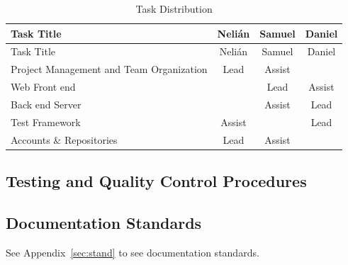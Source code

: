 \begin{center}
\setlength{\extrarowheight}{1.5pt}
  \begin{longtable}{|m{3.25in}|c|c|c|}
 \caption{Task Distribution \label{tasks}} \\
   \hline
  
  \centering Task Title & Nelián & Samuel & Daniel \\
  \hline \hline \endfirsthead
  
     \hline

	\centering Task Title & Nelián & Samuel & Daniel \\  
	\hline \hline \endhead
  
  \endfoot  
  
  Project Management and Team Organization & Lead & Assist & \\ \hline
  Web Front end & & Lead & Assist \\ \hline
  Back end Server & & Assist & Lead \\ \hline
  Test Framework & Assist & & Lead \\ \hline
  Accounts \& Repositories & Lead & Assist & \\ \hline
   \end{longtable}
\end{center}

\subsection{Testing and Quality Control Procedures}

\subsection{Documentation Standards}
See Appendix~\ref{sec:stand} to see documentation standards.
